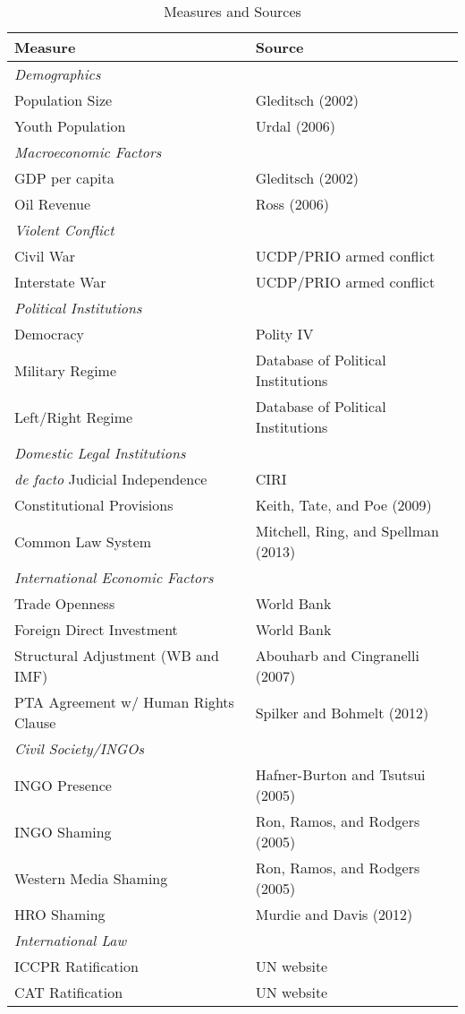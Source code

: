 \documentclass[12pt]{article}
\begin{document}
\begin{table}[htbp!] 
\caption{Measures and Sources} 
\label{tab:vars}
\centering
\begin{tabular}{ll}
Measure & Source \\
\toprule
{\em Demographics} & \\
Population Size & Gleditsch (2002) \\
Youth Population & Urdal (2006) \\ 
\midrule
{\em Macroeconomic Factors} & \\
GDP per capita & Gleditsch (2002) \\
Oil Revenue & Ross (2006) \\ 
\midrule
{\em Violent Conflict} & \\
Civil War & UCDP/PRIO armed conflict \\
Interstate War & UCDP/PRIO armed conflict \\
\midrule
{\em Political Institutions} & \\
Democracy & Polity IV\\
Military Regime & Database of Political Institutions \\
Left/Right Regime & Database of Political Institutions  \\
\midrule
{\em Domestic Legal Institutions} & \\
{\em de facto} Judicial Independence & CIRI \\
Constitutional Provisions & Keith, Tate, and Poe (2009) \\
Common Law System & Mitchell, Ring, and Spellman (2013) \\
\midrule
{\em International Economic Factors} & \\
Trade Openness & World Bank \\
Foreign Direct Investment & World Bank \\
Structural Adjustment (WB and IMF) & Abouharb and Cingranelli (2007) \\
PTA Agreement w/ Human Rights Clause & Spilker and Bohmelt (2012) \\
\midrule
{\em Civil Society/INGOs} & \\
INGO Presence & Hafner-Burton and Tsutsui (2005) \\
INGO Shaming & Ron, Ramos, and Rodgers (2005)  \\
Western Media Shaming & Ron, Ramos, and Rodgers (2005) \\
HRO Shaming & Murdie and Davis (2012) \\
\midrule
{\em International Law} & \\
ICCPR Ratification & UN website \\
CAT Ratification & UN website \\
\bottomrule
\end{tabular}
\end{table}
\end{document}
